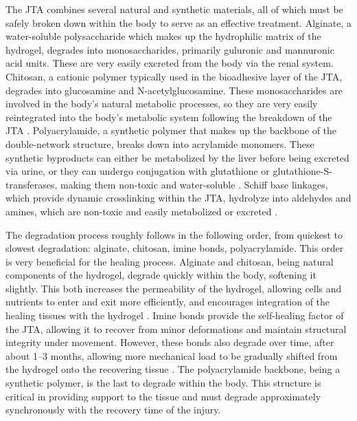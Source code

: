 The JTA combines several natural and synthetic materials, all of which must be safely broken down within the body to serve as an effective treatment. Alginate, a water-soluble polysaccharide which makes up the hydrophilic matrix of the hydrogel, degrades into monosaccharides, primarily guluronic and mannuronic acid units. These are very easily excreted from the body via the renal system. 
Chitosan, a cationic polymer typically used in the bioadhesive layer of the JTA, degrades into glucosamine and N-acetylglucosamine. These monosaccharides are involved in the body's natural metabolic processes, so they are very easily reintegrated into the body's metabolic system following the breakdown of the JTA \autocite{guarinoDegradationPropertiesMetabolic2015}.
Polyacrylamide, a synthetic polymer that makes up the backbone of the double-network structure, breaks down into acrylamide monomers. These synthetic byproducts can either be metabolized by the liver before being excreted via urine, or they can undergo conjugation with glutathione or glutathione-S-transferases, making them non-toxic and water-soluble \autocite{xiongPolyacrylamideDegradationIts2018}.
Schiff base linkages, which provide dynamic crosslinking within the JTA, hydrolyze into aldehydes and amines, which are non-toxic and easily metabolized or excreted \autocite{xuHydrogelsBasedSchiff2019}.

The degradation process roughly follows in the following order, from quickest to slowest degradation: alginate, chitosan, imine bonds, polyacrylamide. This order is very beneficial for the healing process. Alginate and chitosan, being natural components of the hydrogel, degrade quickly within the body, softening it slightly.
This both increases the permeability of the hydrogel, allowing cells and nutrients to enter and exit more efficiently, and encourages integration of the healing tissues with the hydrogel \autocite{RN4}.
Imine bonds provide the self-healing factor of the JTA, allowing it to recover from minor deformations and maintain structural integrity under movement. However, these bonds also degrade over time, after about 1--3 months, allowing more mechanical load to be gradually shifted from the hydrogel onto the recovering tissue \autocite{xuHydrogelsBasedSchiff2019}.
The polyacrylamide backbone, being a synthetic polymer, is the last to degrade within the body. This structure is critical in providing support to the tissue and must degrade approximately synchronously with the recovery time of the injury.